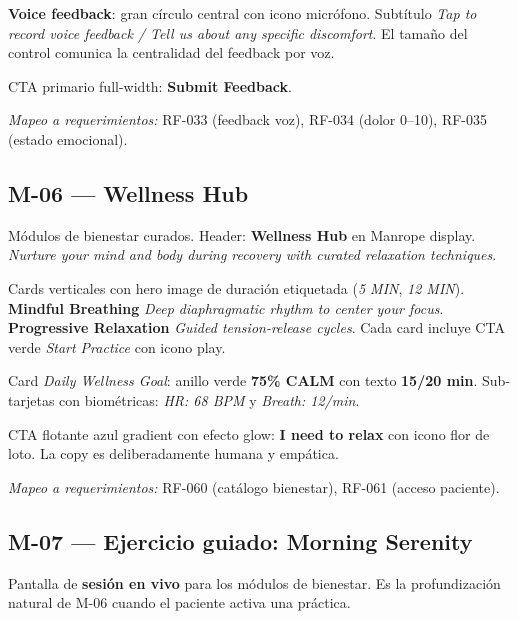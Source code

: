 \textbf{Voice feedback}: gran círculo central con icono micrófono. Subtítulo \textit{Tap to record voice feedback / Tell us about any specific discomfort}. El tamaño del control comunica la centralidad del feedback por voz.

CTA primario full-width: \textbf{Submit Feedback}.

\textit{Mapeo a requerimientos:} RF-033 (feedback voz), RF-034 (dolor 0--10), RF-035 (estado emocional).


\subsection{M-06 --- Wellness Hub}

Módulos de bienestar curados. Header: \textbf{Wellness Hub} en Manrope display. \textit{Nurture your mind and body during recovery with curated relaxation techniques}.

Cards verticales con hero image de duración etiquetada (\textit{5 MIN}, \textit{12 MIN}). \textbf{Mindful Breathing} \textit{Deep diaphragmatic rhythm to center your focus}. \textbf{Progressive Relaxation} \textit{Guided tension-release cycles}. Cada card incluye CTA verde \textit{Start Practice} con icono play.

Card \textit{Daily Wellness Goal}: anillo verde \textbf{75\% CALM} con texto \textbf{15/20 min}. Sub-tarjetas con biométricas: \textit{HR: 68 BPM} y \textit{Breath: 12/min}.

CTA flotante azul gradient con efecto glow: \textbf{I need to relax} con icono flor de loto. La copy es deliberadamente humana y empática.

\textit{Mapeo a requerimientos:} RF-060 (catálogo bienestar), RF-061 (acceso paciente).


\subsection{M-07 --- Ejercicio guiado: Morning Serenity}

Pantalla de \textbf{sesión en vivo} para los módulos de bienestar. Es la profundización natural de M-06 cuando el paciente activa una práctica.

